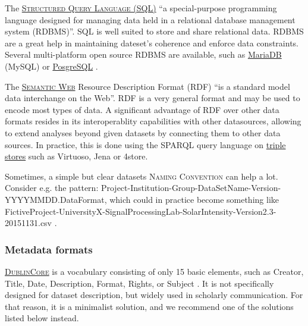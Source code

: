\noindent The  \textsc{\href{https://en.wikipedia.org/wiki/SQL}{Structured Query Language (SQL)}} ``a special-purpose programming language designed for managing data held in a relational database management system (RDBMS)''\cite{wikipedia_sql_2015}. SQL is well suited to store and share relational data. RDBMS are a great help in maintaining dateset's coherence and enforce data constraints. Several multi-platform open source RDBMS are available, such as \href{https://mariadb.org/}{MariaDB} (MySQL) \cite{mariadb_mariadb_2015} or \href{http://www.postgresql.org/}{PosgreSQL} \cite{postgresql_postgresql:_2015}.

\vspace{0.4cm}

\noindent The  \textsc{\href{http://www.w3.org/RDF/}{Semantic Web}} Resource Description Format (RDF) ``is a standard model data interchange on the Web''\cite{w3c_rdf_2014}. RDF is a very general format and may be used to encode most types of data. A significant advantage of RDF over other data formats resides in its interoperablity capabilities with other datasources, allowing to extend analyses beyond given datasets by connecting them to other data sources. In practice, this is done using the SPARQL query language on \href{http://www.w3.org/wiki/LargeTripleStores}{triple stores} such as Virtuoso, Jena or 4store.

\vspace{0.4cm}

\noindent Sometimes, a simple but clear datasets   \textsc{Naming Convention} can help a lot. Consider e.g. the pattern: Project-Institution-Group-DataSetName-Version-YYYYMMDD.DataFormat, which could in practice become something like FictiveProject-UniversityX-SignalProcessingLab-SolarIntensity-Version2.3-20151131.csv .

\subsubsection{Metadata formats}

\noindent {} \textsc{\href{http://dublincore.org/documents/dces/}{DublinCore}} is a vocabulary consisting of only 15 basic elements, such as Creator, Title, Date, Description, Format, Rights, or Subject \cite{dublincore_dublin_3013}. It is not specifically designed for dataset description, but widely used in scholarly communication. For that reason, it is a minimalist solution, and we recommend one of the solutions listed below instead. 

